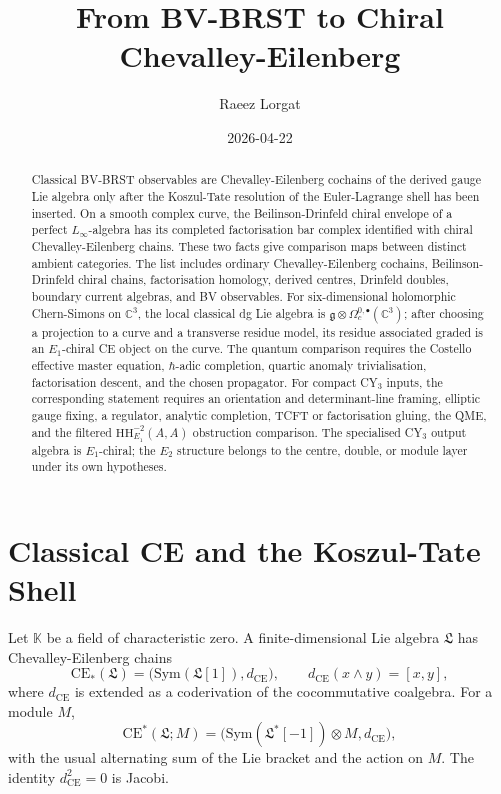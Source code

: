 \documentclass[11pt]{amsart}
\title{From BV-BRST to Chiral Chevalley-Eilenberg}
\author{Raeez Lorgat}
\date{2026-04-22}
\providecommand{\C}{\mathbb{C}}
\providecommand{\KK}{\mathbb{K}}
\providecommand{\gfrak}{\mathfrak{g}}
\providecommand{\Lfrak}{\mathfrak{L}}
\providecommand{\CE}{\mathrm{CE}}
\providecommand{\Sym}{\mathrm{Sym}}
\providecommand{\HH}{\mathrm{HH}}
\theoremstyle{plain}
\theoremstyle{definition}
\theoremstyle{remark}
\begin{document}
\begin{abstract}
Classical BV-BRST observables are Chevalley-Eilenberg cochains of
the derived gauge Lie algebra only after the Koszul-Tate resolution of
the Euler-Lagrange shell has been inserted.  On a smooth complex curve,
the Beilinson-Drinfeld chiral envelope of a perfect
$L_\infty$-algebra has its completed factorisation bar complex
identified with chiral Chevalley-Eilenberg chains.  These two facts give
comparison maps between distinct ambient categories.  The list includes
ordinary Chevalley-Eilenberg cochains, Beilinson-Drinfeld chiral
chains, factorisation homology, derived centres, Drinfeld doubles,
boundary current algebras, and BV observables.  For six-dimensional
holomorphic Chern-Simons on $\C^3$, the local classical dg Lie algebra
is $\gfrak\otimes\Omega^{0,\bullet}_c(\C^3)$; after choosing a
projection to a curve and a transverse residue model, its residue
associated graded is an $E_1$-chiral CE object on the curve.  The
quantum comparison requires the Costello effective master equation,
$\hbar$-adic completion, quartic anomaly trivialisation, factorisation
descent, and the chosen propagator.  For compact CY$_3$ inputs, the
corresponding statement requires an orientation and determinant-line
framing, elliptic gauge fixing, a regulator, analytic completion, TCFT
or factorisation gluing, the QME, and the filtered
$\HH^{-2}_{E_1}(A,A)$ obstruction comparison.  The specialised CY$_3$
output algebra is $E_1$-chiral; the $E_2$ structure belongs to the
centre, double, or module layer under its own hypotheses.
\end{abstract}

\maketitle
\tableofcontents

\section{Classical CE and the Koszul-Tate Shell}
\label{sec:linear}

Let $\KK$ be a field of characteristic zero.  A finite-dimensional Lie
algebra $\Lfrak$ has Chevalley-Eilenberg chains
\[
  \CE_*(\Lfrak)
  =
  \bigl(\Sym(\Lfrak[1]), d_\CE\bigr),
  \qquad
  d_\CE(x\wedge y) = [x,y],
\]
where $d_\CE$ is extended as a coderivation of the cocommutative
coalgebra.  For a module $M$,
\[
  \CE^*(\Lfrak;M)
  =
  \bigl(\Sym(\Lfrak^*[-1])\otimes M,d_\CE\bigr),
\]
with the usual alternating sum of the Lie bracket and the action on
$M$.  The identity $d_\CE^2=0$ is Jacobi.
\end{document}
